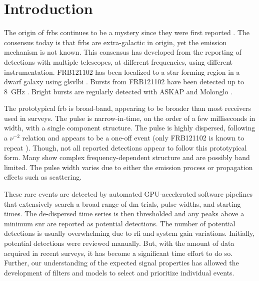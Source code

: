 \documentclass[a4paper,fleqn,usenatbib]{mnras}
\begin{document}
\section{Introduction}
\label{sec:intro}


The origin of \glspl{frb} continues to be a mystery since they were first
reported \citep{2007Sci...318..777L}.  The consensus today is that \glspl{frb}
are extra-galactic in origin, yet the emission mechanism is not known.  This
consensus has developed from the reporting of detections with multiple
telescopes, at different frequencies, using different instrumentation.
FRB121102 has been localized to a star forming region in a dwarf galaxy using
gls{vlbi} \citep{2017ApJ...834L...7T,2017Natur.541...58C}.  Bursts from
FRB121102 have been detected up to 8~GHz \citep{atel10675}. Bright bursts are
regularly detected with ASKAP and Molonglo
\citep{2017ApJ...841L..12B,2017MNRAS.468.3746C,atel10693}.

The prototypical \gls{frb} is broad-band, appearing to be broader than most
receivers used in surveys. The pulse is narrow-in-time, on the order of a few
milliseconds in width, with a single component structure. The pulse is highly
dispersed, following a $\nu^{-2}$ relation and appears to be a one-off event
(only FRB121102 is known to repeat \citep{2016Natur.531..202S}).  Though, not
all reported detections appear to follow this prototypical form. Many show
complex frequency-dependent structure and are possibly band limited. The pulse
width varies due to either the emission process or propagation effects such as
scattering.


These rare events are detected by automated GPU-accelerated software pipelines
that extensively search a broad range of \gls{dm} trials, pulse widths, and
starting times.  The de-dispersed time series is then thresholded and any
peaks above a minimum \gls{snr} are reported as potential detections. The number
of potential detections is usually overwhelming due to \gls{rfi} and system gain
variations. Initially, potential detections were reviewed manually. But, with
the amount of data acquired in recent surveys, it has become a significant time
effort to do so. Further, our understanding of the expected signal properties
has allowed the development of filters and models to select and prioritize
individual events.
\end{document}
